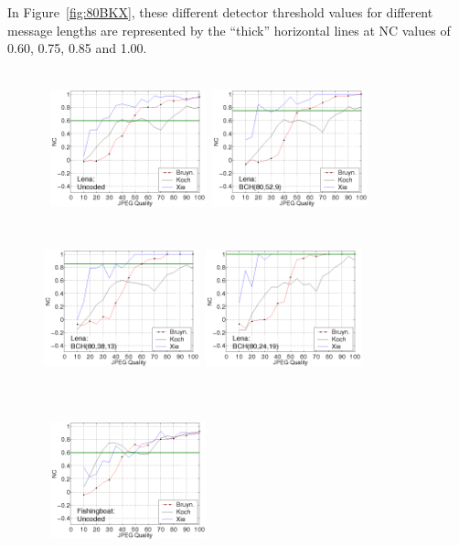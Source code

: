 \documentclass[10pt,twocolumn]{article}
\begin{document}
\normalsize
In Figure~\ref{fig:80BKX}, these different detector threshold values for different message lengths are represented by the
``thick'' horizontal lines at NC values of 0.60, 0.75, 0.85 and 1.00.
\begin{figure}[!htb]
\setlength{\abovecaptionskip}{-0.25cm}
\centerline{ \hbox{
        \includegraphics[height=4.5cm,width=4.5cm]{Lena80_80_1.png}
        \includegraphics[height=4.5cm,width=4.5cm]{Lena80_52_9.png}
        \includegraphics[height=4.5cm,width=4.5cm]{Lena80_38_13.png}
        \includegraphics[height=4.5cm,width=4.5cm]{Lena80_24_19.png}
}} 
\centerline{ \hbox{
        \includegraphics[height=4.5cm,width=4.5cm]{Fishingboat80_80_1.png}
}}
\end{figure}
\end{document}
